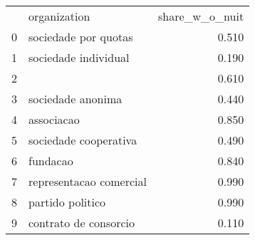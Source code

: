 \begin{tabular}{llr}
 & organization & share_w_o_nuit \\
0 & sociedade por quotas & 0.510 \\
1 & sociedade individual & 0.190 \\
2 &  & 0.610 \\
3 & sociedade anonima & 0.440 \\
4 & associacao & 0.850 \\
5 & sociedade cooperativa & 0.490 \\
6 & fundacao & 0.840 \\
7 & representacao comercial & 0.990 \\
8 & partido politico & 0.990 \\
9 & contrato de consorcio & 0.110 \\
\end{tabular}
